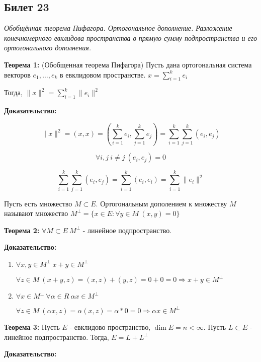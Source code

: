 \subsection{Билет 23}

\textit{Обобщённая теорема Пифагора. Ортогональное дополнение. Разложение конечномерного евклидова пространства в прямую сумму подпространства и его ортогонального дополнения.}

\textbf{Теорема 1:} (Обобщенная теорема Пифагора) Пусть дана ортогональная система векторов $e_1,\ldots,e_k$ в евклидовом пространстве. $x = \sum_{i=1}^k e_i$

Тогда, $\|x\|^2 = \sum_{i=1}^k \|e_i\|^2$

\textbf{Доказательство:}

$$
  \|x\|^2 = (x,x) = (\sum_{i=1}^k e_i,\sum_{j=1}^k e_j) = \sum_{i=1}^k \sum_{j=1}^k (e_i,e_j)
$$

$$
  \forall i,j ~ i\neq j ~ (e_i,e_j) = 0
$$

$$
 \sum_{i=1}^k \sum_{j=1}^k (e_i,e_j) = \sum_{i=1}^k (e_i,e_i) = \sum_{i=1}^k\|e_i\|^2
$$ 

Пусть есть множество $M \subset E$. Ортогональным дополением к множеству $M$ называют множество $M^\bot = \{x\in E: \forall y \in M ~ (x,y) = 0\}$

\textbf{Теорема 2:} $\forall M \subset E ~ M^\bot$ - линейное подпространство.

\textbf{Доказательство:}

\begin{enumerate}
 \item $\forall x,y \in M^\bot ~ x+y \in M^\bot$
      
       $\forall z \in M ~ (x+y,z) = (x,z)+(y,z) = 0+0 = 0 \Rightarrow x+y \in M^\bot$
 \item $\forall x \in M^\bot ~ \forall \alpha \in R ~ \alpha x \in M^\bot$
       
       $\forall z \in M ~ (\alpha x,z) = \alpha(x,z) = \alpha * 0 = 0 \Rightarrow \alpha x \in M^\bot$
\end{enumerate}

\textbf{Теорема 3:} Пусть $E$ - евклидово пространство, $\dim E = n < \infty$. Пусть $L \subset E$ - линейное подпространство. Тогда, $E = L + L^\bot$

\textbf{Доказательство: } 

